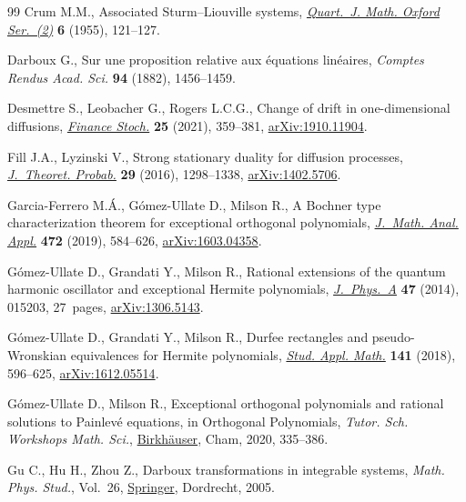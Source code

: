 \documentclass[10pt,a4paper]{amsart}
\numberwithin{equation}{section}
\theoremstyle{definition}
\def\i{{\textnormal i}}
\begin{document}
\begin{thebibliography}{99}
Crum M.M., Associated {S}turm--{L}iouville systems,
 \href{https://doi.org/10.1093/qmath/6.1.121}{\textit{Quart.~J. Math. Oxford
 Ser.~(2)}} \textbf{6} (1955), 121--127.

Darboux G., Sur une proposition relative aux \'equations lin\'eaires,
 \textit{Comptes Rendus Acad. Sci.} \textbf{94} (1882), 1456--1459.

Desmettre S., Leobacher G., Rogers L.C.G., Change of drift in one-dimensional
 diffusions, \href{https://doi.org/10.1007/s00780-021-00451-w}{\textit{Finance
 Stoch.}} \textbf{25} (2021), 359--381,
 \href{http://arxiv.org/abs/1910.11904}{arXiv:1910.11904}.

Fill J.A., Lyzinski V., Strong stationary duality for diffusion processes,
 \href{https://doi.org/10.1007/s10959-015-0612-1}{\textit{J.~Theoret.
 Probab.}} \textbf{29} (2016), 1298--1338,
 \href{http://arxiv.org/abs/1402.5706}{arXiv:1402.5706}.

Garc\'{\i}a-Ferrero M.{\'A}., G\'omez-Ullate D., Milson R., A {B}ochner type
 characterization theorem for exceptional orthogonal polynomials,
 \href{https://doi.org/10.1016/j.jmaa.2018.11.042}{\textit{J.~Math. Anal.
 Appl.}} \textbf{472} (2019), 584--626,
 \href{http://arxiv.org/abs/1603.04358}{arXiv:1603.04358}.

G\'omez-Ullate D., Grandati Y., Milson R., Rational extensions of the quantum
 harmonic oscillator and exceptional {H}ermite polynomials,
 \href{https://doi.org/10.1088/1751-8113/47/1/015203}{\textit{J.~Phys.~A}}
 \textbf{47} (2014), 015203, 27~pages,
 \href{http://arxiv.org/abs/1306.5143}{arXiv:1306.5143}.

G\'omez-Ullate D., Grandati Y., Milson R., Durfee rectangles and
 pseudo-{W}ronskian equivalences for {H}ermite polynomials,
 \href{https://doi.org/10.1111/sapm.12225}{\textit{Stud. Appl. Math.}}
 \textbf{141} (2018), 596--625,
 \href{http://arxiv.org/abs/1612.05514}{arXiv:1612.05514}.

G\'omez-Ullate D., Milson R., Exceptional orthogonal polynomials and rational
 solutions to {P}ainlev\'e equations, in Orthogonal {P}olynomials, \textit{Tutor. Sch. Workshops Math. Sci.},
 \href{https://doi.org/10.1007/978-3-030-36744-2_15}{Birkh\"auser}, Cham,
 2020, 335--386.

Gu C., Hu H., Zhou Z., Darboux transformations in integrable systems,
 \textit{Math. Phys. Stud.}, Vol.~26,
 \href{https://doi.org/10.1007/1-4020-3088-6}{Springer}, Dordrecht, 2005.


\end{thebibliography}
\end{document}
